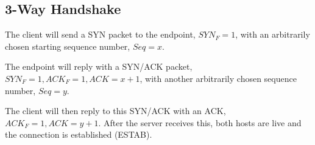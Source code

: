\subsection{3-Way Handshake}

The client will send a SYN packet to the endpoint, $SYN_F=1$, with an
arbitrarily chosen starting sequence number, $Seq=x$.

The endpoint will reply with a SYN/ACK packet, $SYN_F=1, ACK_F=1, ACK=x+1$,
with another arbitrarily chosen sequence number, $Seq=y$.

The client will then reply to this SYN/ACK with an ACK, $ACK_F=1, ACK=y+1$.
After the server receives this, both hosts are live and the connection
is established (ESTAB).